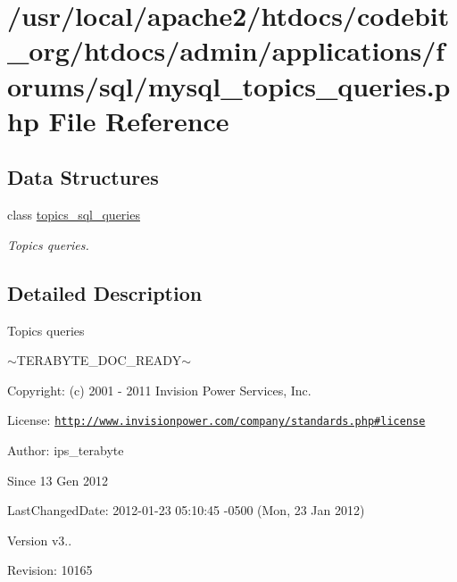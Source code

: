 \hypertarget{mysql__topics__queries_8php}{\section{/usr/local/apache2/htdocs/codebit\-\_\-org/htdocs/admin/applications/forums/sql/mysql\-\_\-topics\-\_\-queries.php File Reference}
\label{mysql__topics__queries_8php}
}
\subsection*{Data Structures}
\begin{DoxyCompactItemize}
\item 
class \hyperlink{classtopics__sql__queries}{topics\-\_\-sql\-\_\-queries}
\begin{DoxyCompactList}\small\item\em Topics queries. \end{DoxyCompactList}\end{DoxyCompactItemize}


\subsection{Detailed Description}
\begin{DoxyVerb}  Topics queries
\end{DoxyVerb}
 $\sim$\-T\-E\-R\-A\-B\-Y\-T\-E\-\_\-\-D\-O\-C\-\_\-\-R\-E\-A\-D\-Y$\sim$ \begin{DoxyParagraph}{Copyright\-:}
(c) 2001 -\/ 2011 Invision Power Services, Inc.
\end{DoxyParagraph}
\begin{DoxyParagraph}{License\-:}
\href{http://www.invisionpower.com/company/standards.php#license}{\tt http\-://www.\-invisionpower.\-com/company/standards.\-php\#license}
\end{DoxyParagraph}
\begin{DoxyParagraph}{Author\-:}
ips\-\_\-terabyte 
\end{DoxyParagraph}
\begin{DoxySince}{Since}
13 Gen 2012 
\end{DoxySince}
\begin{DoxyParagraph}{Last\-Changed\-Date\-:}
2012-\/01-\/23 05\-:10\-:45 -\/0500 (Mon, 23 Jan 2012) 
\end{DoxyParagraph}
\begin{DoxyVersion}{Version}
v3.. 
\end{DoxyVersion}
\begin{DoxyParagraph}{Revision\-:}
10165 
\end{DoxyParagraph}
